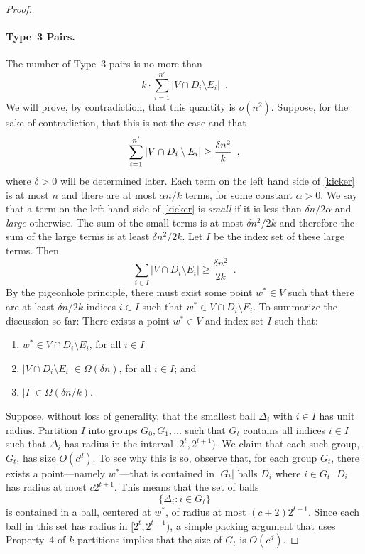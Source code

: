 \documentclass{patmorin}
\begin{document}
\begin{proof}
  \paragraph{Type~3 Pairs.}
  The number of Type~3 pairs is no more than 
  \[  
     k\cdot\sum_{i=1}^{n'}|V\cap D_i\setminus E_i| \enspace .
  \]
  We will prove, by contradiction, that this quantity is $o(n^2)$.
  Suppose, for the sake of contradiction, that this is not the case
  and that
  \begin{equation}
    \sum_{i=1}^{n'} |V\cap D_i\setminus E_i| \ge \frac{\delta n^2}{k}
         \enspace , \eqlabel{kicker}
  \end{equation}
  where $\delta>0$ will be determined later.
  Each term on the left hand side of \eqref{kicker} is at most $n$
  and there are at most $\alpha n/k$ terms, for some constant $\alpha
  >0$.  We say that a term on the left hand side of \eqref{kicker} is
  \emph{small} if it is less than $\delta n/2\alpha$ and \emph{large}
  otherwise.  The sum of the small terms is at most $\delta n^2/2k$
  and therefore the sum of the large terms is at least $\delta n^2/2k$.
  Let $I$ be the index set of these large terms.  Then
  \[
    \sum_{i\in I} |V\cap D_i\setminus E_i| \ge \frac{\delta n^2}{2k} \enspace .
  \]
  By the pigeonhole principle, there must exist some point $w^*\in V$
  such that there are at least $\delta n/2k$ indices $i\in I$ such that
  $w^*\in V\cap D_i\setminus E_i$.  To summarize the discussion so far:
  There exists a point $w^*\in V$ and index set $I$
  such that:
  \begin{enumerate}
     \item $w^*\in V\cap D_{i}\setminus E_{i}$, for all
        $i\in I$
     \item $|V\cap D_{i}\setminus E_{i}|\in \Omega(\delta n)$,
       for all $i\in I$; and
     \item $|I|\in\Omega(\delta n/k)$.
  \end{enumerate}

  Suppose, without loss of generality, that the smallest ball
  $\Delta_i$ with $i\in I$ has unit radius.  Partition $I$ into groups
  $G_0,G_1,\ldots$ such that $G_t$ contains all indices $i\in I$ such
  that $\Delta_{i}$ has radius in the interval $[2^t,2^{t+1})$.  We claim
  that each such group, $G_t$, has size $O(c^d)$.  To see why this is
  so, observe that, for each group $G_t$, there exists a point---namely
  $w^*$---that is contained in $|G_t|$ balls $D_{i}$ where $i\in G_t$.
  $D_{i}$ has radius at most $c2^{t+1}$.  This means that the set of balls
  \[
     \{ \Delta_i : i\in G_t\}
  \]
  is contained in a ball, centered at $w^*$, of radius at most
  $(c+2)2^{t+1}$.  Since each ball in this set has radius in
  $[2^t,2^{t+1})$, a simple packing argument that uses Property~4 of
  $k$-partitions implies that the size of $G_t$ is $O(c^d)$.


\end{proof}
\end{document}
